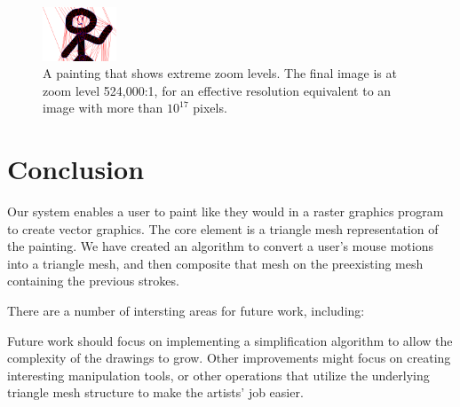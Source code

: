 \documentclass[review]{acmsiggraph}
\begin{document}
\begin{figure}
        \includegraphics[width=0.195\textwidth]{images/zoom72}
    \caption{A painting that shows extreme zoom levels.  The final image is at zoom level 524,000:1, for an effective resolution equivalent to an image with more than $10^{17}$ pixels.}
    \label{fig:boxes}
\end{figure}

\section{Conclusion}
Our system enables a user to paint like they would in a raster graphics program 
to create vector graphics. The core element is a triangle mesh representation of the painting.
We have created an algorithm to convert a user's mouse motions into a triangle mesh, and then composite that mesh on the preexisting mesh containing the previous strokes.

There are a number of intersting areas for future work, including:


Future work should focus on
implementing a simplification algorithm to allow the complexity of the drawings to grow. Other
improvements might focus on creating interesting manipulation tools, or other operations that utilize
the underlying triangle mesh structure to make the artists' job easier.




\end{document}
